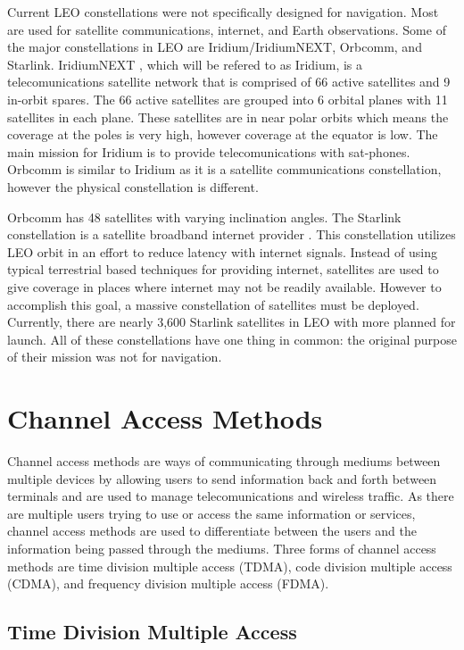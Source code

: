\documentclass[12pt]{report}
\begin{document}
Current LEO constellations were not specifically designed for navigation. Most are used for satellite communications, internet, and Earth observations. Some of the major constellations in LEO are Iridium/IridiumNEXT, Orbcomm, and Starlink. IridiumNEXT \cite{IridiumNEXTReview2019}, which will be refered to as Iridium, is a telecomunications satellite network that is comprised of 66 active satellites and 9 in-orbit spares. The 66 active satellites are grouped into 6 orbital planes with 11 satellites in each plane. These satellites are in near polar orbits which means the coverage at the poles is very high, however coverage at the equator is low. The main mission for Iridium is to provide telecomunications with sat-phones. Orbcomm is similar to Iridium as it is a satellite communications constellation, however the physical constellation is different. 

Orbcomm has 48 satellites with varying inclination angles. The Starlink constellation is a satellite broadband internet provider \cite{Starlink}. This constellation utilizes LEO orbit in an effort to reduce latency with internet signals. Instead of using typical terrestrial based techniques for providing internet, satellites are used to give coverage in places where internet may not be readily available. However to accomplish this goal, a massive constellation of satellites must be deployed. Currently, there are nearly 3,600 Starlink satellites in LEO with more planned for launch. All of these constellations have one thing in common: the original purpose of their mission was not for navigation. 

\section{Channel Access Methods}

Channel access methods are ways of communicating through mediums between multiple devices by allowing users to send information back and forth between terminals and are used to manage telecomunications and wireless traffic. As there are multiple users trying to use or access the same information or services, channel access methods are used to differentiate between the users and the information being passed through the mediums. Three forms of channel access methods are time division multiple access (TDMA), code division multiple access (CDMA), and frequency division multiple access (FDMA). 

\subsection{Time Division Multiple Access}\label{sec:TDMAsection}
\end{document}
